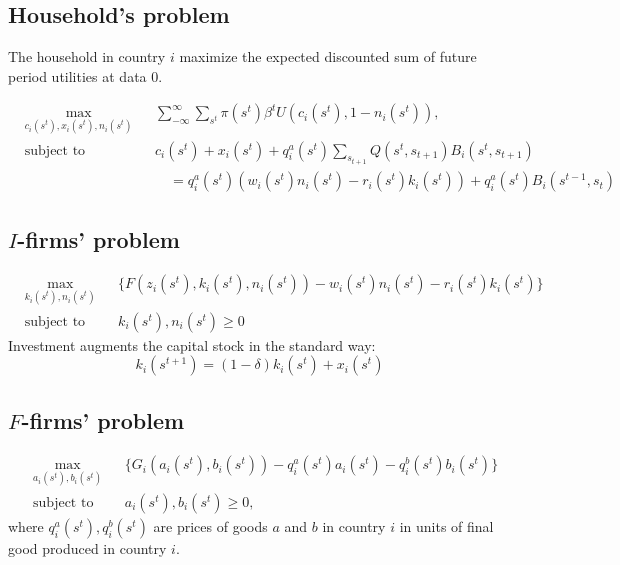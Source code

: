 \documentclass[11pt,a4paper]{article}
\begin{document}
\subsection{Household's problem}
The household in country $i$ maximize the expected discounted sum of future period utilities at data 0.

\begin{equation*}
 \begin{aligned}
 & \underset{c_i(s^t),x_i(s^{t}),n_i(s^t)}{\text{max}}
 & & \sum^\infty_{-\infty}\sum_{s^t}\pi(s^t)\beta^t U(c_i(s^t),1-n_i(s^t)), \\
 & \text{subject to}
 & &  c_i(s^t) +x_i(s^t)+q_i^a(s^t)\sum_{s_{t+1}}Q(s^t,s_{t+1})B_i(s^t,s_{t+1})\\
 &&&\quad =q_i^a(s^t)(w_i(s^t)n_i(s^t)-r_i(s^t)k_i(s^t))+q_i^a(s^t)B_i(s^{t-1},s_t)
 \end{aligned}
\end{equation*}

\subsection{$I$-firms' problem} 

\begin{equation*}
 \begin{aligned}
 & \underset{k_i(s^t),n_i(s^t)}{\text{max}}
 & & \{F(z_i(s^t),k_i(s^t),n_i(s^t))-w_i(s^t)n_i(s^t)-r_i(s^t)k_i(s^t)\} \\
 & \text{subject to}
 & & k_i(s^t),n_i(s^t)\geq 0
 \end{aligned}
\end{equation*}
Investment augments the capital stock in the standard way:
\begin{equation}
k_i(s^{t+1})=(1-\delta)k_i(s^t)+x_i(s^t)
\end{equation}


\subsection{$F$-firms' problem}
\begin{equation*}
 \begin{aligned}
 & \underset{a_i(s^t),b_i(s^t)}{\text{max}}
 & & \{G_i(a_i(s^t),b_i(s^t))-q_i^a(s^t)a_i(s^t)-q_i^b(s^t)b_i(s^t)\} \\
 & \text{subject to}
 & & a_i(s^t),b_i(s^t) \geq 0,
 \end{aligned}
\end{equation*}
where $q_i^a(s^t),q_i^b(s^t)$ are prices of goods $a$ and $b$ in country $i$ in units of final good produced in country $i$.
\end{document}
